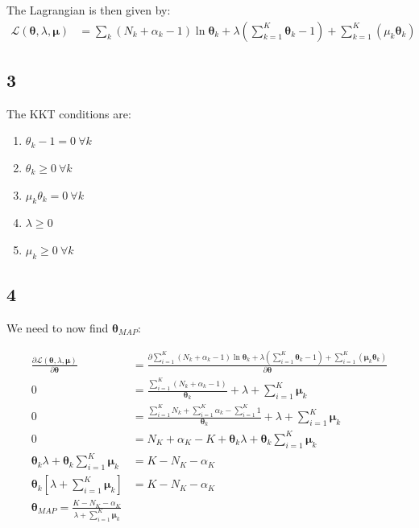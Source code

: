 \documentclass[a4paper]{article}
\begin{document}
The Lagrangian is then given by:
\begin{align*}
    \mathcal{L}(\pmb{\theta}, \lambda, \pmb{\mu}) &= \sum_{k}(N_{k} + \alpha_{k} -1)\ln{\pmb{\theta}_{k}} + \lambda(\sum_{k=1}^{K}\pmb{\theta}_{k} - 1) + \sum_{k=1}^{K}(\mu_{k}\pmb{\theta}_{k})
\end{align*}

\subsection*{3}
The KKT conditions are:
\begin{enumerate}
    \item $\theta_{k}-1 = 0 \ \forall k$
    \item $\theta_{k} \geq 0 \ \forall k$
    \item $\mu_{k}\theta_{k} = 0 \ \forall k$
    \item $\lambda \geq 0 $
    \item $ \mu_{k} \geq 0 \ \forall k$
\end{enumerate}

\subsection*{4}
We need to now find $\pmb{\theta}_{MAP}$:

\begin{align*}
    \frac{\partial \mathcal{L}(\pmb{\theta}, \lambda, \pmb{\mu})}{\partial \pmb{\theta}} &= \frac{\partial \sum_{i=1}^{K}(N_{k} + \alpha_{k} -1)\ln{\pmb{\theta}_{k}} + \lambda(\sum_{i=1}^{K}\pmb{\theta}_{k} - 1) + \sum_{i=1}^{K}(\pmb{\mu}_{k}\pmb{\theta}_{k})}{\partial \pmb{\theta}} \\
    0 &=\frac{\sum_{i=1}^{K}(N_{k} + \alpha_{k} -1)}{\pmb{\theta}_{k}} + \lambda + \sum_{i=1}^{K}\pmb{\mu}_{k}\\
    0 &= \frac{\sum_{i=1}^{K}N_{k} + \sum_{i=1}^{K}\alpha_{k} -\sum_{i=1}^{K}1}{\pmb{\theta}_{k}} + \lambda + \sum_{i=1}^{K}\pmb{\mu}_{k}\\
    0 &= N_{K} + \alpha_{K} - K + \pmb{\theta}_{k}\lambda + \pmb{\theta}_{k}\sum_{i=1}^{K}\pmb{\mu}_{k} \\
    \pmb{\theta}_{k}\lambda + \pmb{\theta}_{k}\sum_{i=1}^{K}\pmb{\mu}_{k} &=  K - N_{K} - \alpha_{K}\\
    \pmb{\theta}_{k} [\lambda + \sum_{i=1}^{K}\pmb{\mu}_{k}] &= K - N_{K} - \alpha_{K}\\
    \pmb{\theta}_{MAP} = \frac{K - N_{K} - \alpha_{K}}{\lambda + \sum_{i=1}^{K}\pmb{\mu}_{k}}
\end{align*}
\bigskip
\end{document}
